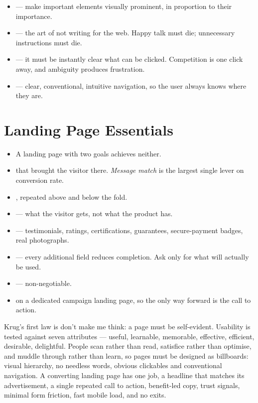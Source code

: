 \documentclass{MMTextbook}
\begin{document}
\begin{itemize}
\item {} --- make important elements visually
      prominent, in proportion to their importance.
\item {} --- the art of not writing for the web. Happy
      talk must die; unnecessary instructions must die.
\item {} --- it must be instantly clear what can be
      clicked. Competition is one click away, and ambiguity produces frustration.
\item {} --- clear, conventional,
      intuitive navigation, so the user always knows where they are.
\end{itemize}

\section{Landing Page Essentials}

\begin{itemize}
\item {} A landing page with two goals achieves neither.
\item {} that brought the visitor
      there. \emph{Message match} is the largest single lever on conversion rate.
\item {}, repeated above and below
      the fold.
\item {} --- what the visitor gets, not
      what the product has.
\item {} --- testimonials, ratings, certifications, guarantees,
      secure-payment badges, real photographs.
\item {} --- every additional field reduces completion.
      Ask only for what will actually be used.
\item {} --- non-negotiable.
\item {} on a dedicated campaign landing page, so
      the only way forward is the call to action.
\end{itemize}

\begin{summarybox}
Krug's first law is don't make me think: a page must be self-evident. Usability
is tested against seven attributes --- useful, learnable, memorable, effective,
efficient, desirable, delightful. People scan rather than read, satisfice rather
than optimise, and muddle through rather than learn, so pages must be designed
as billboards: visual hierarchy, no needless words, obvious clickables and
conventional navigation. A converting landing page has one job, a headline that
matches its advertisement, a single repeated call to action, benefit-led copy,
trust signals, minimal form friction, fast mobile load, and no exits.
\end{summarybox}
\end{document}

